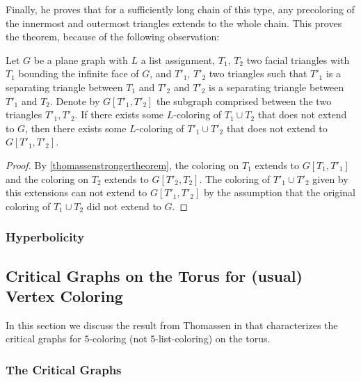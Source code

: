 
Finally, he proves that for a sufficiently long chain of this type, any precoloring of the innermost and outermost triangles extends to the whole chain. This proves the theorem, because of the following observation:

\begin{proposition}
	Let $G$ be a plane graph with $L$ a list assignment, $T_1$, $T_2$ 
	two facial triangles with $T_1$ bounding the infinite face of $G$, 
	and $T'_1$, $T'_2$ two triangles such that $T'_1$ is a separating 
	triangle between $T_1$ and $T'_2$ and $T'_2$ is a separating 
	triangle between $T'_1$ and $T_2$. Denote by $G[T'_1, T'_2]$ the 
	subgraph comprised between the two triangles $T'_1, T'_2$.  
	If there exists some $L$-coloring of $T_1 \cup T_2$ that does not 
	extend to $G$, then there exists some $L$-coloring of $T'_1 \cup T'_2$ 
	that does not extend to $G[T'_1, T'_2]$.
\end{proposition}

\begin{proof}
	By \ref{thomassenstrongertheorem}, the coloring on $T_1$ extends to 
	$G[T_1, T'_1]$ and the coloring on $T_2$ extends to $G[T'_2, T_2]$. 
	The coloring of $T'_1 \cup T'_2$ given by this extensions can not 
	extend to $G[T'_1, T'_2]$ by the assumption that the original coloring 
	of $T_1 \cup T_2$ did not extend to $G$.
\end{proof}

\subsubsection{Hyperbolicity}

\subsection{Critical Graphs on the Torus for (usual) Vertex Coloring}

In this section we discuss the result from Thomassen in \cite{thomassentorus} that characterizes the critical graphs for $5$-coloring (not $5$-list-coloring) on the torus.

\subsubsection{The Critical Graphs}

